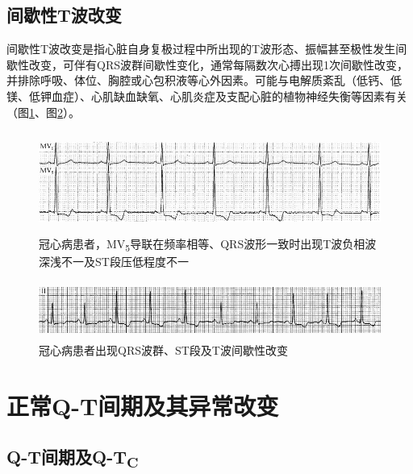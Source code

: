 \protect\hypertarget{text00012.htmlux5cux23subid99}{}{}

\section{间歇性T波改变}

间歇性T波改变是指心脏自身复极过程中所出现的T波形态、振幅甚至极性发生间歇性改变，可伴有QRS波群间歇性变化，通常每隔数次心搏出现1次间歇性改变，并排除呼吸、体位、胸腔或心包积液等心外因素。可能与电解质紊乱（低钙、低镁、低钾血症）、心肌缺血缺氧、心肌炎症及支配心脏的植物神经失衡等因素有关（图\ref{fig6-18}、图\ref{fig6-19}）。

\begin{figure}[!htbp]
 \centering
 \includegraphics[width=5.58333in,height=1.30208in]{./images/Image00110.jpg}
 \captionsetup{justification=centering}
 \caption{冠心病患者，MV\textsubscript{5}导联在频率相等、QRS波形一致时出现T波负相波深浅不一及ST段压低程度不一}
 \label{fig6-18}
  \end{figure} 


\begin{figure}[!htbp]
 \centering
 \includegraphics[width=5.58333in,height=0.75in]{./images/Image00111.jpg}
 \captionsetup{justification=centering}
 \caption{冠心病患者出现QRS波群、ST段及T波间歇性改变}
 \label{fig6-19}
  \end{figure} 

\protect\hypertarget{text00013.html}{}{}

\protect\hypertarget{text00013.htmlux5cux23chapter13}{}{}

\chapter{正常Q-T间期及其异常改变}

\protect\hypertarget{text00013.htmlux5cux23subid100}{}{}

\section{Q-T间期及Q-T\textsubscript{C}}

